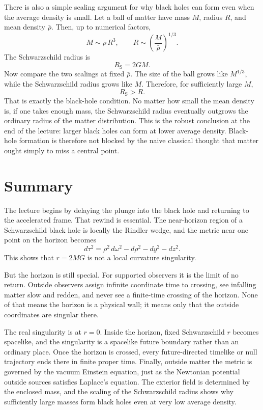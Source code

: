 There is also a simple scaling argument for why black holes can form even when the average density is small. Let a ball of matter have mass \(M\), radius \(R\), and mean density \(\bar\rho\). Then, up to numerical factors,
\begin{equation}
M\sim \bar\rho\,R^3,
\qquad
R\sim\left(\frac{M}{\bar\rho}\right)^{1/3}.
\end{equation}
The Schwarzschild radius is
\begin{equation}
R_{\mathrm S}=2GM.
\end{equation}
Now compare the two scalings at fixed \(\bar\rho\). The size of the ball grows like \(M^{1/3}\), while the Schwarzschild radius grows like \(M\). Therefore, for sufficiently large \(M\),
\begin{equation}
R_{\mathrm S}>R.
\end{equation}
That is exactly the black-hole condition. No matter how small the mean density is, if one takes enough mass, the Schwarzschild radius eventually outgrows the ordinary radius of the matter distribution. This is the robust conclusion at the end of the lecture: larger black holes can form at lower average density. Black-hole formation is therefore not blocked by the naive classical thought that matter ought simply to miss a central point.

\section{Summary}

The lecture begins by delaying the plunge into the black hole and returning to the accelerated frame. That rewind is essential. The near-horizon region of a Schwarzschild black hole is locally the Rindler wedge, and the metric near one point on the horizon becomes
\begin{equation}
d\tau^2=\rho^2\,d\omega^2-d\rho^2-dy^2-dz^2.
\end{equation}
This shows that \(r=2MG\) is not a local curvature singularity.

But the horizon is still special. For supported observers it is the limit of no return. Outside observers assign infinite coordinate time to crossing, see infalling matter slow and redden, and never see a finite-time crossing of the horizon. None of that means the horizon is a physical wall; it means only that the outside coordinates are singular there.

The real singularity is at \(r=0\). Inside the horizon, fixed Schwarzschild \(r\) becomes spacelike, and the singularity is a spacelike future boundary rather than an ordinary place. Once the horizon is crossed, every future-directed timelike or null trajectory ends there in finite proper time. Finally, outside matter the metric is governed by the vacuum Einstein equation, just as the Newtonian potential outside sources satisfies Laplace’s equation. The exterior field is determined by the enclosed mass, and the scaling of the Schwarzschild radius shows why sufficiently large masses form black holes even at very low average density.